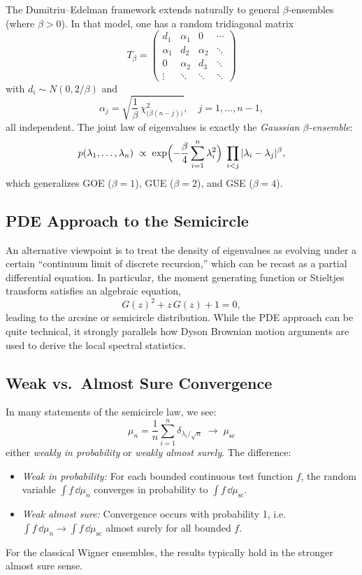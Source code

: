 \documentclass[letterpaper,11pt,oneside,reqno]{article}
\numberwithin{equation}{section}
\theoremstyle{definition}
\begin{document}
The Dumitriu--Edelman framework extends naturally to general $\beta$-ensembles (where $\beta>0$). In that model, one has a random tridiagonal matrix
\[
  T_\beta
  =
  \begin{pmatrix}
   d_1 & \alpha_1 & 0 & \cdots \\
   \alpha_1 & d_2 & \alpha_2 & \ddots \\
   0 & \alpha_2 & d_3 & \ddots \\
   \vdots & \ddots & \ddots & \ddots
  \end{pmatrix}
\]
with $d_i \sim N(0,2/\beta)$ and
\[
  \alpha_j
  = \sqrt{\frac{1}{\beta}\,\chi^2_{\bigl(\beta(n-j)\bigr)}},
  \quad j=1,\ldots,n-1,
\]
all independent. The joint law of eigenvalues is exactly the \emph{Gaussian $\beta$-ensemble}:
\[
  p(\lambda_1,\dots,\lambda_n)
  \;\propto\;
  \exp\Bigl(-\frac{\beta}{4}\sum_{i=1}^n \lambda_i^2\Bigr)
  \;\prod_{i<j}|\lambda_i - \lambda_j|^\beta,
\]
which generalizes GOE ($\beta=1$), GUE ($\beta=2$), and GSE ($\beta=4$).

\subsection{PDE Approach to the Semicircle}

An alternative viewpoint is to treat the density of eigenvalues as evolving under a certain “continuum limit of discrete recursion,” which can be recast as a partial differential equation. In particular, the moment generating function or Stieltjes transform satisfies an algebraic equation,
\[
  G(z)^2 + z\,G(z)+1=0,
\]
leading to the arcsine or semicircle distribution. While the PDE approach can be quite technical, it strongly parallels how Dyson Brownian motion arguments are used to derive the local spectral statistics.

\subsection{Weak vs.\ Almost Sure Convergence}

In many statements of the semicircle law, we see:
\[
  \mu_n = \frac1n \sum_{i=1}^n \delta_{\lambda_i/\sqrt{n}}
  \;\longrightarrow\;
  \mu_{\mathrm{sc}}
\]
either \emph{weakly in probability} or \emph{weakly almost surely}. The difference:
\begin{itemize}
\item \emph{Weak in probability:} For each bounded continuous test function $f$, the random variable $\int f\,\dd \mu_n$ converges in probability to $\int f\,\dd \mu_{\mathrm{sc}}$.
\item \emph{Weak almost sure:} Convergence occurs with probability 1, i.e.\ \(\int f\,\dd \mu_n \to \int f\,\dd \mu_{\mathrm{sc}}\) almost surely for all bounded $f$.
\end{itemize}
For the classical Wigner ensembles, the results typically hold in the stronger almost sure sense.
\end{document}
